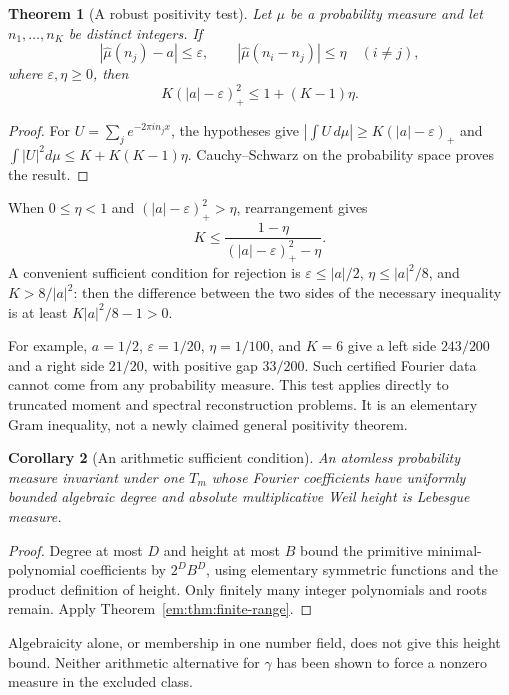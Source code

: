 \documentclass[11pt,a4paper]{article}
\newtheorem{theorem}{Theorem}[section]
\newtheorem{corollary}[theorem]{Corollary}
\theoremstyle{definition}
\theoremstyle{remark}
\theoremstyle{plain}
\numberwithin{equation}{section}
\begin{document}
\begin{theorem}[A robust positivity test]\label{em:thm:robust}
Let $\mu$ be a probability measure and let $n_1,\ldots,n_K$ be
distinct integers. If
\[
 |\widehat\mu(n_j)-a|\le\varepsilon,
 \qquad |\widehat\mu(n_i-n_j)|\le\eta\quad(i\ne j),
\]
where $\varepsilon,\eta\ge0$, then
\begin{equation}\label{em:eq:robust}
 K(|a|-\varepsilon)_+^2\le1+(K-1)\eta.
\end{equation}
\end{theorem}
\begin{proof}
For $U=\sum_j e^{-2\pi in_jx}$, the hypotheses give
$|\int U\,d\mu|\ge K(|a|-\varepsilon)_+$ and
$\int|U|^2d\mu\le K+K(K-1)\eta$.
Cauchy--Schwarz on the probability space proves the result.
\end{proof}
When $0\le\eta<1$ and $(|a|-\varepsilon)_+^2>\eta$, rearrangement gives
\[
 K\le\frac{1-\eta}{(|a|-\varepsilon)_+^2-\eta}.
\]
A convenient sufficient condition for rejection is
$\varepsilon\le |a|/2$, $\eta\le |a|^2/8$, and
$K>8/|a|^2$: then the difference between the two sides of the necessary
inequality is at least $K|a|^2/8-1>0$.

For example, $a=1/2$, $\varepsilon=1/20$, $\eta=1/100$, and
$K=6$ give a left side $243/200$ and a right side $21/20$,
with positive gap $33/200$. Such certified Fourier data cannot
come from any probability measure. This test applies directly to
truncated moment and spectral reconstruction problems. It is an
elementary Gram inequality, not a newly claimed general positivity
theorem.

\begin{corollary}[An arithmetic sufficient condition]
An atomless probability measure invariant under one $T_m$ whose
Fourier coefficients have uniformly bounded algebraic degree and
absolute multiplicative Weil height is Lebesgue measure.
\end{corollary}
\begin{proof}
Degree at most $D$ and height at most $B$ bound the primitive
minimal-polynomial coefficients by $2^DB^D$, using elementary
symmetric functions and the product definition of height. Only
finitely many integer polynomials and roots remain. Apply
Theorem~\ref{em:thm:finite-range}.
\end{proof}
Algebraicity alone, or membership in one number field, does not give
this height bound. Neither arithmetic alternative for $\gamma$ has
been shown to force a nonzero measure in the excluded class.
\end{document}
